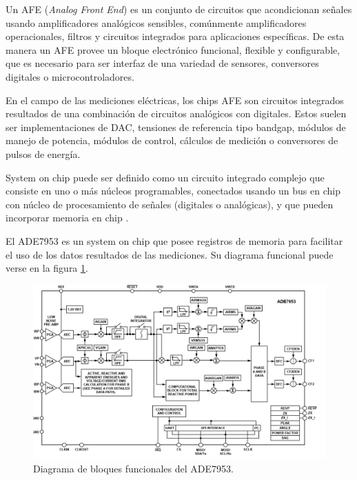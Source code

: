 
Un AFE (\textit{Analog Front End}) es un conjunto de circuitos que acondicionan señales usando amplificadores analógicos sensibles, comúnmente amplificadores operacionales, filtros y circuitos integrados para aplicaciones específicas. De esta manera un AFE provee un bloque electrónico funcional, flexible y configurable, que es necesario para ser interfaz de una variedad de sensores, conversores digitales o microcontroladores.

En el campo de las mediciones eléctricas, los chips AFE son circuitos integrados resultados de una combinación de circuitos analógicos con digitales. Estos suelen ser implementaciones de DAC, tensiones de referencia tipo bandgap, módulos de manejo de potencia, módulos de control, cálculos de medición o conversores de pulsos de energía.


System on chip puede ser definido como un circuito integrado complejo que consiste en uno o más núcleos programables, conectados usando un bus en chip con núcleo de procesamiento de señales (digitales o analógicas), y que pueden incorporar memoria en chip \cite{badawy2002system}. 

El ADE7953 es un system on chip que posee registros de memoria para facilitar el uso de los datos resultados de las mediciones. Su diagrama funcional puede verse en la figura \ref{fig:ADEfuncbloc}.

\begin{figure}[h]
	\centering
	\includegraphics[width=\textwidth , keepaspectratio]{Figures/ade7953funcdiagr.png}
	\caption{Diagrama de bloques funcionales del ADE7953.}
	\label{fig:ADEfuncbloc}
\end{figure}


